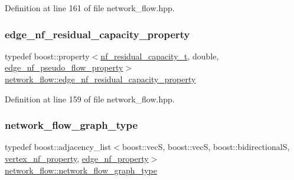 Definition at line 161 of file network\+\_\+flow.\+hpp.

\mbox{\label{classnetwork__flow_a240b4140cc421faeaf98d493015fd9f3}} 
\subsubsection{\texorpdfstring{edge\+\_\+nf\+\_\+residual\+\_\+capacity\+\_\+property}{edge\_nf\_residual\_capacity\_property}}
{\footnotesize\ttfamily typedef boost\+::property$<$\hyperlink{structnetwork__flow_1_1nf__residual__capacity__t}{nf\+\_\+residual\+\_\+capacity\+\_\+t}, double, \hyperlink{classnetwork__flow_a22a6d10c77a1cfb9279a65517001e559}{edge\+\_\+nf\+\_\+pseudo\+\_\+flow\+\_\+property}$>$ \hyperlink{classnetwork__flow_a240b4140cc421faeaf98d493015fd9f3}{network\+\_\+flow\+::edge\+\_\+nf\+\_\+residual\+\_\+capacity\+\_\+property}\hspace{0.3cm}{\ttfamily [private]}}



Definition at line 159 of file network\+\_\+flow.\+hpp.

\mbox{\label{classnetwork__flow_abfdb8d1baba183c2b121f8c078b9b640}} 
\subsubsection{\texorpdfstring{network\+\_\+flow\+\_\+graph\+\_\+type}{network\_flow\_graph\_type}}
{\footnotesize\ttfamily typedef boost\+::adjacency\+\_\+list$<$boost\+::vecS, boost\+::vecS, boost\+::bidirectionalS, \hyperlink{classnetwork__flow_ae9862e011ed505ae9795617b0725fa9e}{vertex\+\_\+nf\+\_\+property}, \hyperlink{classnetwork__flow_a09cdef033c08baeb9ef03c21f0a5947d}{edge\+\_\+nf\+\_\+property}$>$ \hyperlink{classnetwork__flow_abfdb8d1baba183c2b121f8c078b9b640}{network\+\_\+flow\+::network\+\_\+flow\+\_\+graph\+\_\+type}}



